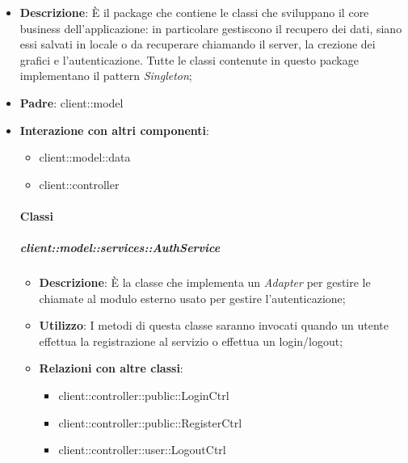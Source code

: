 \begin{itemize}
	\item \textbf{Descrizione}: È il package che contiene le classi che sviluppano il core business dell'applicazione: in particolare gestiscono il recupero dei dati, siano essi salvati in locale o da recuperare chiamando il server, la crezione dei grafici e l'autenticazione.
	Tutte le classi contenute in questo package implementano il pattern \emph{Singleton};
	\item \textbf{Padre}: client::model
	\item \textbf{Interazione con altri componenti}:
		\begin{itemize}
			\item client::model::data
			\item client::controller
		\end{itemize}
	
	\paragraph{Classi} %

		\subparagraph{client::model::services::AuthService} %
		\label{subp:client_model_services_authservice}
			\begin{itemize}
				\item \textbf{Descrizione}: È la classe che implementa un \emph{Adapter} per gestire le chiamate al modulo esterno usato per gestire l'autenticazione;
				\item \textbf{Utilizzo}: I metodi di questa classe saranno invocati quando un utente effettua la registrazione al servizio o effettua un login/logout;
				\item \textbf{Relazioni con altre classi}: 					
					\begin{itemize}
						\item client::controller::public::LoginCtrl
						\item client::controller::public::RegisterCtrl
						\item client::controller::user::LogoutCtrl
					\end{itemize}
			\end{itemize}
		

\end{itemize}
